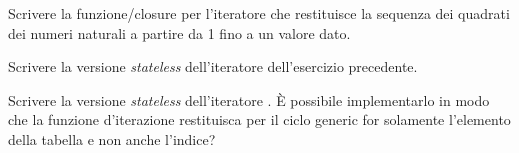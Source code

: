 \begin{Exercise}[label=iter-03]
Scrivere la funzione/closure per l'iteratore che restituisce la sequenza dei
quadrati dei numeri naturali a partire da 1 fino a un valore dato.
\end{Exercise}

\begin{Exercise}[label=iter-04]
Scrivere la versione \emph{stateless} dell'iteratore dell'esercizio precedente.
\end{Exercise}

\begin{Exercise}[label=iter-05]
Scrivere la versione \emph{stateless} dell'iteratore . È possibile
implementarlo in modo che la funzione d'iterazione restituisca per il ciclo
generic for solamente l'elemento della tabella e non anche l'indice?
\end{Exercise}


